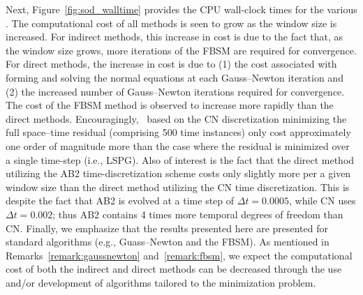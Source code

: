 Next, Figure~\ref{fig:sod_walltime} provides the CPU wall-clock times for the various \methodAcronymROMs. The computational cost of all methods is seen to grow 
as the window size is increased. For indirect methods, this increase in cost is due to the fact that, as the window size 
grows, more iterations of the FBSM are required for convergence. For direct methods, the increase in cost is due to (1) the cost 
associated with forming and solving the normal equations at each Gauss--Newton iteration and (2) the increased number of 
Gauss--Newton iterations required for convergence. The cost of the FBSM method is observed to increase more rapidly 
than the direct methods. Encouragingly, \methodAcronymROMs\ based on the CN discretization
minimizing the full space--time residual (comprising 
500 time instances) only  
cost approximately one order of magnitude more than the case where the residual is minimized over a single time-step (i.e., LSPG). Also of interest is the 
fact that the direct method utilizing the AB2 time-discretization scheme costs only slightly more per a given window size than the direct method 
utilizing the CN time discretization. This is despite the fact that AB2 is evolved at a time step of $\Delta t = 0.0005$, while CN uses $\Delta t = 0.002$; thus 
AB2 contains 4 times more temporal degrees of freedom than CN.  Finally, we emphasize that the 
results presented here are presented for standard algorithms (e.g., Guass--Newton and the FBSM). As mentioned in 
Remarks~\ref{remark:gaussnewton} and~\ref{remark:fbsm}, we expect the computational cost 
of both the indirect and direct methods can be decreased through the use and/or development of 
algorithms tailored to the minimization problem. 


